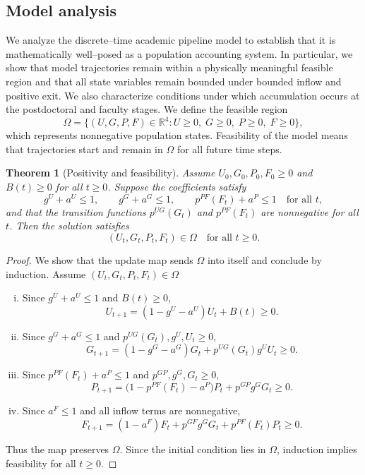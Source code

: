 \documentclass[3p]{elsarticle}%
\newtheorem{theorem}{Theorem}
\theoremstyle{definition}
\begin{document}
\subsection{Model analysis}
 \noindent We analyze the discrete--time academic pipeline model to establish that it is mathematically well--posed as a population accounting system. In particular, we show that model trajectories remain within a physically meaningful feasible region and that all state variables remain bounded under bounded inflow and positive exit. We also characterize conditions under which accumulation occurs at the postdoctoral and faculty stages. We define the feasible region
\[
\Omega = \{(U,G,P,F)\in\mathbb{R}^4 : U\geq 0,\; G\geq 0,\; P\geq 0,\; F\geq 0\},
\]
which represents nonnegative population states. Feasibility of the model means that trajectories start and remain in \(\Omega\) for all future time steps.

\begin{theorem}[Positivity and feasibility]\label{thm:positivity}
Assume \(U_0,G_0,P_0,F_0 \geq 0\) and \(B(t)\geq 0\) for all \(t\geq 0\). Suppose the coefficients satisfy
\[
g^U+a^U \leq 1,\qquad g^G+a^G \leq 1,\qquad p^{PF}(F_t)+a^P \leq 1 \quad \text{for all } t,
\]
and that the transition functions \(p^{UG}(G_t)\) and \(p^{PF}(F_t)\) are nonnegative for all \(t\).
Then the solution satisfies
\[
(U_t,G_t,P_t,F_t)\in\Omega \quad \text{for all } t\geq 0.
\]
\end{theorem}

\begin{proof}
We show that the update map sends \(\Omega\) into itself and conclude by induction.
Assume \((U_t,G_t,P_t,F_t)\in\Omega\)

\begin{enumerate}[(i)]
\item Since \(g^U+a^U\leq 1\) and \(B(t)\geq 0\),
\[
U_{t+1}=(1-g^U-a^U)U_t + B(t) \geq 0.
\]

\item Since \(g^G+a^G\leq 1\) and \(p^{UG}(G_t), g^U, U_t\geq 0\),
\[
G_{t+1}=(1-g^G-a^G)G_t + p^{UG}(G_t)g^U U_t \geq 0.
\]

\item Since \(p^{PF}(F_t)+a^P\leq 1\) and \(p^{GP},g^G,G_t\geq 0\),
\[
P_{t+1}=\bigl(1-p^{PF}(F_t)-a^P\bigr)P_t + p^{GP}g^G G_t \geq 0.
\]

\item Since \(a^F\leq 1\) and all inflow terms are nonnegative,
\[
F_{t+1}=(1-a^F)F_t + p^{GF}g^G G_t + p^{PF}(F_t)P_t \geq 0.
\]
\end{enumerate}

\noindent Thus the map preserves \(\Omega\). Since the initial condition lies in \(\Omega\), induction implies feasibility for all \(t\geq 0\).
\end{proof}
\end{document}
